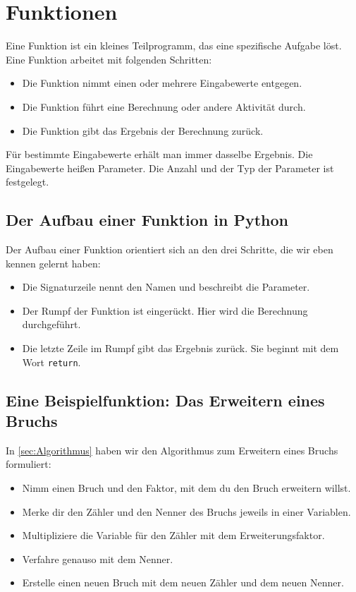 \section{Funktionen}

Eine Funktion ist ein kleines Teilprogramm, das eine spezifische Aufgabe löst. Eine Funktion arbeitet mit folgenden Schritten:
\begin{itemize}
	\item Die Funktion nimmt einen oder mehrere Eingabewerte entgegen.
	\item Die Funktion führt eine Berechnung oder andere Aktivität durch.
	\item Die Funktion gibt das Ergebnis der Berechnung zurück.
\end{itemize}

Für bestimmte Eingabewerte erhält man immer dasselbe Ergebnis. Die Eingabewerte heißen Parameter. Die Anzahl und der Typ der Parameter ist festgelegt.

\subsection{Der Aufbau einer Funktion in Python}

Der Aufbau einer Funktion orientiert sich an den drei Schritte, die wir eben kennen gelernt haben:
\begin{itemize}
	\item Die Signaturzeile nennt den Namen und beschreibt die Parameter.
	\item Der Rumpf der Funktion ist eingerückt. Hier wird die Berechnung durchgeführt.
	\item Die letzte Zeile im Rumpf gibt das Ergebnis zurück. Sie beginnt mit dem Wort \texttt{return}.
\end{itemize}

\subsection{Eine Beispielfunktion: Das Erweitern eines Bruchs}

In \ref{sec:Algorithmus} haben wir den Algorithmus zum Erweitern eines Bruchs formuliert:
\begin{itemize}
	\item Nimm einen Bruch und den Faktor, mit dem du den Bruch erweitern willst.
	\item Merke dir den Zähler und den Nenner des Bruchs jeweils in einer Variablen.
	\item Multipliziere die Variable für den Zähler mit dem Erweiterungsfaktor.
	\item Verfahre genauso mit dem Nenner.
	\item Erstelle einen neuen Bruch mit dem neuen Zähler und dem neuen Nenner.
\end{itemize}


